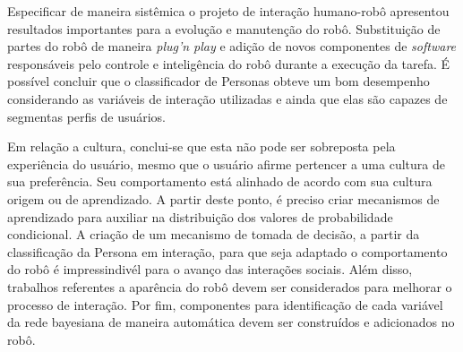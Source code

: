 Especificar de maneira sistêmica o projeto de interação humano-robô apresentou resultados importantes para a evolução e manutenção do robô. Substituição de partes do robô de maneira \emph{plug'n play} e adição de novos componentes de \emph{software} responsáveis pelo controle e inteligência do robô durante a execução da tarefa. É possível concluir que o classificador de Personas obteve um bom desempenho considerando as variáveis de interação utilizadas e ainda que elas são capazes de segmentas perfis de usuários.

Em relação a cultura, conclui-se que esta não pode ser sobreposta pela experiência do usuário, mesmo que o usuário afirme pertencer a uma cultura de sua preferência. Seu comportamento está alinhado de acordo com sua cultura origem ou de aprendizado. A partir deste ponto, é preciso criar mecanismos de aprendizado para auxiliar na distribuição dos valores de probabilidade condicional. A criação de um mecanismo de tomada de decisão, a partir da classificação da Persona em interação, para que seja adaptado o comportamento do robô é impressindivél para o avanço das interações sociais. Além disso, trabalhos referentes a aparência do robô devem ser considerados para melhorar o processo de interação. Por fim, componentes para identificação de cada variável da rede bayesiana de maneira automática devem ser construídos e adicionados no robô.


